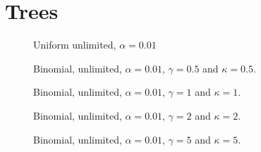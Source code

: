 \newpage
\section{Trees}
%
%
%
%
%

\begin{figure}
    \centering
    \scalebox{0.5}{}
    \caption{Uniform unlimited, $\alpha = 0.01$}
    \label{unif_unlim_a0.01}
\end{figure}

\begin{figure}
    \centering
    \begin{minipage}[t]{0.45\textwidth} 
        \centering
        \scalebox{0.6}{}
        \caption{Binomial, unlimited, $\alpha = 0.01$, $\gamma=0.5$ and $\kappa=0.5$.}
        \label{binom_unlim_a0.01_g0.5_k0.5}
    \end{minipage}
    \hfill
    \centering
    \begin{minipage}[t]{0.45\textwidth} 
        \centering
        \scalebox{0.6}{}
        \caption{Binomial, unlimited, $\alpha = 0.01$, $\gamma=1$ and $\kappa=1$.}
        \label{binom_unlim_a0.01_g1_k1}
    \end{minipage}
\end{figure}

\begin{figure}
    \centering
    \begin{minipage}[t]{0.45\textwidth} 
        \centering
        \scalebox{0.6}{}
        \caption{Binomial, unlimited, $\alpha = 0.01$, $\gamma=2$ and $\kappa=2$.}
        \label{binom_unlim_a0.01_g2_k2}
    \end{minipage}
    \hfill
    \centering
    \begin{minipage}[t]{0.45\textwidth} 
        \centering
        \scalebox{0.6}{}
        \caption{Binomial, unlimited, $\alpha = 0.01$, $\gamma=5$ and $\kappa=5$.}
        \label{binom_unlim_a0.01_g5_k5}
    \end{minipage}
\end{figure}


